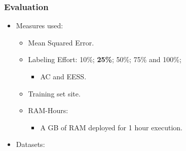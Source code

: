 \documentclass[14pt]{beamer}
\begin{document}
\begin{frame}\frametitle{Evaluation}

\begin{itemize}
\item Measures used:
\begin{itemize}
\item Mean Squared Error.
\item Labeling Effort: 10\%; \textbf{25\%}; 50\%; 75\% and 100\%;
\begin{itemize}
\item AC and EESS.
\end{itemize}
\item Training set site.
\item RAM-Hours:
\begin{itemize}
\item A GB of RAM deployed for 1 hour execution.
\end{itemize}
\end{itemize}
\item Datasets:
\end{itemize}
\begin{table}
\centering
{}
\end{table}
\end{frame}

\end{document}
